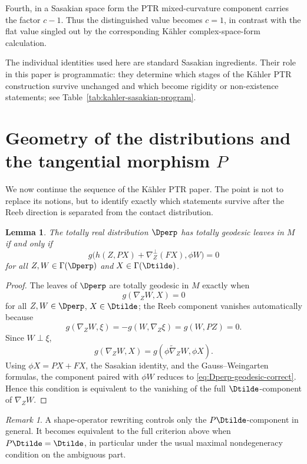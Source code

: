 \documentclass[11pt]{article}
\newtheorem{lemma}[theorem]{Lemma}\newtheorem{corollary}[theorem]{Corollary}
\theoremstyle{definition}\newtheorem{definition}[theorem]{Definition}\newtheorem{example}[theorem]{Example}
\theoremstyle{remark}\newtheorem{remark}[theorem]{Remark}
\begin{document}
Fourth, in a Sasakian space form the PTR mixed-curvature component carries
the factor \(c-1\).  Thus the distinguished value becomes \(c=1\), in
contrast with the flat value singled out by the corresponding K\"ahler
complex-space-form calculation.

The individual identities used here are standard Sasakian ingredients.
Their role in this paper is programmatic: they determine which stages of
the K\"ahler PTR construction survive unchanged and which become rigidity
or non-existence statements; see Table~\ref{tab:kahler-sasakian-program}.

\section{Geometry of the distributions and the tangential morphism \(P\)}
We now continue the sequence of the K\"ahler PTR paper.  The point is not to replace its notions, but to identify exactly which statements survive after the Reeb direction is separated from the contact distribution.

\begin{lemma}\label{lem:Dperp-geodesic}
The totally real distribution \(\Dperp\) has totally geodesic leaves in
\(M\) if and only if
\begin{equation}\label{eq:Dperp-geodesic-correct}
g\bigl(h(Z,PX)+\nabla_Z^\perp(FX),\phi W\bigr)=0
\end{equation}
for all \(Z,W\in\Gamma(\Dperp)\) and
\(X\in\Gamma(\Dtilde)\).
\end{lemma}

\begin{proof}
The leaves of \(\Dperp\) are totally geodesic in \(M\) exactly when
\[
g(\nabla_ZW,X)=0
\]
for all \(Z,W\in\Dperp\), \(X\in\Dtilde\); the Reeb component vanishes
automatically because
\[
g(\nabla_ZW,\xi)=-g(W,\nabla_Z\xi)=g(W,PZ)=0.
\]
Since \(W\perp\xi\),
\[
g(\nabla_ZW,X)
=
g(\phi\widetilde\nabla_ZW,\phi X).
\]
Using
\(\phi X=PX+FX\), the Sasakian identity, and the Gauss--Weingarten
formulas, the component paired with \(\phi W\) reduces to
\eqref{eq:Dperp-geodesic-correct}.  Hence this condition is equivalent to
the vanishing of the full \(\Dtilde\)-component of \(\nabla_ZW\).
\end{proof}

\begin{remark}
A shape-operator rewriting controls only the
\(P\Dtilde\)-component in general.  It becomes equivalent to the full
criterion above when \(P\Dtilde=\Dtilde\), in particular under the usual
maximal nondegeneracy condition on the ambiguous part.
\end{remark}
\end{document}
